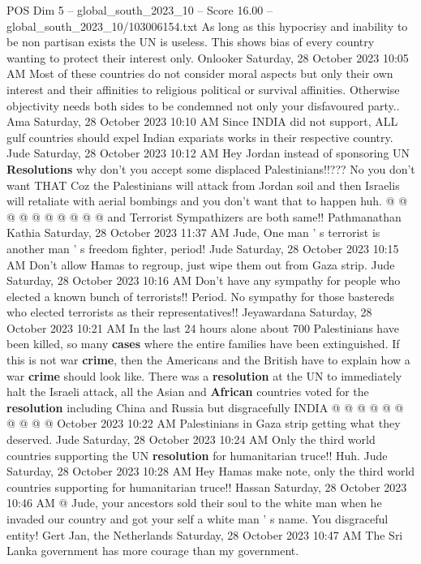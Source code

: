 \begin{textsample}{POS Dim 5 – global\_south\_2023\_10 – Score 16.00 – global\_south\_2023\_10/103006154.txt}
As long as this hypocrisy and inability to be non partisan exists the UN is useless.
This shows bias of every country wanting to protect their interest only.
Onlooker Saturday, 28 October 2023 10:05 AM Most of these countries do not consider moral aspects but only their own interest and their affinities to religious political or survival affinities.
Otherwise objectivity needs both sides to be condemned not only your disfavoured party..
Ama Saturday, 28 October 2023 10:10 AM Since INDIA did not support, ALL gulf countries should expel Indian expariats works in their respective country.
Jude Saturday, 28 October 2023 10:12 AM Hey Jordan instead of sponsoring UN \textbf{Resolutions} why don't you accept some displaced Palestinians!!???
No you don't want THAT Coz the Palestinians will attack from Jordan soil and then Israelis will retaliate with aerial bombings and you don't want that to happen huh. @ @ @ @ @ @ @ @ @ @ and Terrorist Sympathizers are both same!!
Pathmanathan Kathia Saturday, 28 October 2023 11:37 AM Jude, One man ' s terrorist is another man ' s freedom fighter, period!
Jude Saturday, 28 October 2023 10:15 AM Don't allow Hamas to regroup, just wipe them out from Gaza strip.
Jude Saturday, 28 October 2023 10:16 AM Don't have any sympathy for people who elected a known bunch of terrorists!!
Period.
No sympathy for those bastereds who elected terrorists as their representatives!!
Jeyawardana Saturday, 28 October 2023 10:21 AM In the last 24 hours alone about 700 Palestinians have been killed, so many \textbf{cases} where the entire families have been extinguished.
If this is not war \textbf{crime}, then the Americans and the British have to explain how a war \textbf{crime} should look like.
There was a \textbf{resolution} at the UN to immediately halt the Israeli attack, all the Asian and \textbf{African} countries voted for the \textbf{resolution} including China and Russia but disgracefully INDIA @ @ @ @ @ @ @ @ @ @ October 2023 10:22 AM Palestinians in Gaza strip getting what they deserved.
Jude Saturday, 28 October 2023 10:24 AM Only the third world countries supporting the UN \textbf{resolution} for humanitarian truce!!
Huh.
Jude Saturday, 28 October 2023 10:28 AM Hey Hamas make note, only the third world countries supporting for humanitarian truce!!
Hassan Saturday, 28 October 2023 10:46 AM @ Jude, your ancestors sold their soul to the white man when he invaded our country and got your self a white man ' s name.
You disgraceful entity!
Gert Jan, the Netherlands Saturday, 28 October 2023 10:47 AM The Sri Lanka government has more courage than my government.

\end{textsample}
